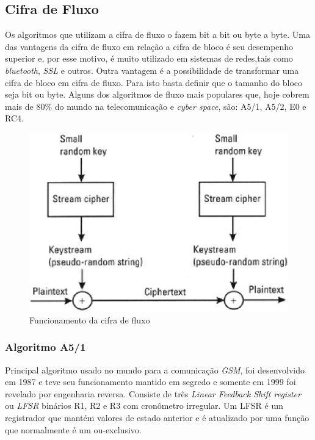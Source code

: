\subsection{Cifra de Fluxo}
\label{stream-cipher}

Os algoritmos que utilizam a cifra de fluxo o fazem bit a bit ou byte a byte. Uma das vantagens da cifra de fluxo em relação a cifra de bloco é seu desempenho superior e, por esse motivo, é muito utilizado em sistemas de redes,tais como \textit{bluetooth}, \textit{SSL} e outros. Outra vantagem é a possibilidade de transformar uma cifra de bloco em cifra de fluxo. Para isto basta definir que o tamanho do bloco seja bit ou byte. Alguns dos algoritmos de fluxo mais populares que, hoje cobrem mais de 80$\%$ do mundo na telecomunicação e \textit{cyber space}, são: A5/1, A5/2, E0 e RC4. ~\cite{majid-mohd}
\begin{figure}[h]
\centering
\includegraphics[keepaspectratio=true,scale=0.7]
    {figuras/stream_cipher.eps}
    \caption[Funcionamento da cifra de fluxo]{Funcionamento da cifra de fluxo\protect\footnotemark} 
\end{figure}

\subsubsection{Algoritmo A5/1}
\label{algorithm-a51}

Principal algoritmo usado no mundo para a comunicação \textit{GSM}, foi desenvolvido em 1987 e teve seu funcionamento mantido em segredo e somente em 1999 foi revelado por engenharia reversa. Consiste de três \textit{Linear Feedback Shift register} ou \textit{LFSR} binários R1, R2 e R3 com cronômetro irregular. Um LFSR é um registrador que mantém valores de estado anterior e é atualizado por uma função que normalmente é um ou-exclusivo. 

